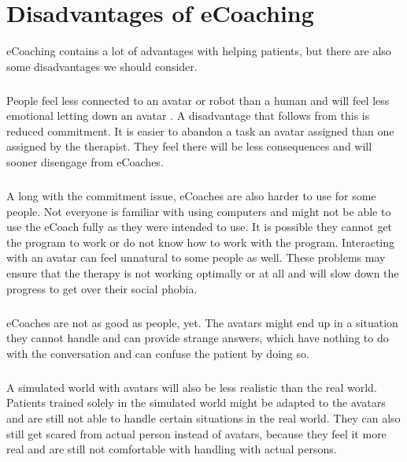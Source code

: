\documentclass[english,a4paper,pdftex]{report}
\begin{document}
\chapter{Disadvantages of eCoaching}
eCoaching contains a lot of advantages with helping patients, but there are also some disadvantages we should consider. 
\paragraph{}
People feel less connected to an avatar or robot than a human and will feel less emotional letting down an avatar \cite{clutterbuck2009virtual}. A disadvantage that follows from this is reduced commitment. It is easier to abandon a task an avatar assigned than one assigned by the therapist. They feel there will be less consequences and will sooner disengage from eCoaches.
\paragraph{}
A long with the commitment issue, eCoaches are also harder to use for some people. Not everyone is familiar with using computers and might not be able to use the eCoach fully as they were intended to use. It is possible they cannot get the program to work or do not know how to work with the program. Interacting with an avatar can feel unnatural to some people as well. These problems may ensure that the therapy is not working optimally or at all and will slow down the progress to get over their social phobia.
\paragraph{}
eCoaches are not as good as people, yet. The avatars might end up in a situation they cannot handle and can provide strange answers, which have nothing to do with the conversation and can confuse the patient by doing so. 
\paragraph{}
A simulated world with avatars will also be less realistic than the real world. Patients trained solely in the simulated world might be adapted to the avatars and are still not able to handle certain situations in the real world. They can also still get scared from actual person instead of avatars, because they feel it more real and are still not comfortable with handling with actual persons.  
\end{document}
